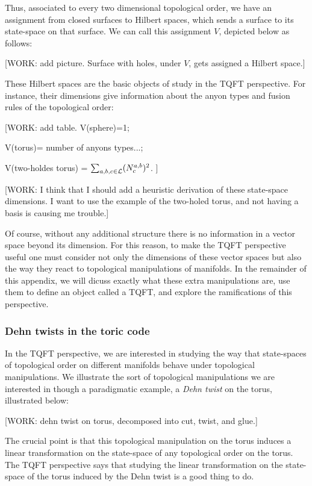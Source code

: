 Thus, associated to every two dimensional topological order, we have an assignment from closed surfaces to Hilbert spaces, which sends a surface to its state-space on that surface. We can call this assignment $V$, depicted below as follows:

[WORK: add picture. Surface with holes, under $V$, gets assigned a Hilbert space.]

These Hilbert spaces are the basic objects of study in the TQFT perspective. For instance, their dimensions give information about the anyon types and fusion rules of the topological order:

[WORK: add table. 
V(sphere)=1;

V(torus)= number of anyons types...;

V(two-holdes torus) = $\sum_{a,b,c\in {\mathcal L}}(N^{a,b}_c)^2$.
]

[WORK: I think that I should add a heuristic derivation of these state-space dimensions. I want to use the example of the two-holed torus, and not having a basis is causing me trouble.]

Of course, without any additional structure there is no information in a vector space beyond its dimension. For this reason, to make the TQFT perspective useful one must consider not only the dimensions of these vector spaces but also the way they react to topological manipulations of manifolds. In the remainder of this appendix, we will dicuss exactly what these extra manipulations are, use them to define an object called a TQFT, and explore the ramifications of this perspective.

\subsubsection{Dehn twists in the toric code}

In the TQFT perspective, we are interested in studying the way that state-spaces of topological order on different manifolds behave under topological manipulations. We illustrate the sort of topological manipulations we are interested in though a paradigmatic example, a \textit{Dehn twist} on the torus, illustrated below:

[WORK: dehn twist on torus, decomposed into cut, twist, and glue.]

The crucial point is that this topological manipulation on the torus induces a linear transformation on the state-space of any topological order on the torus. The TQFT perspective says that studying the linear transformation on the state-space of the torus induced by the Dehn twist is a good thing to do.


